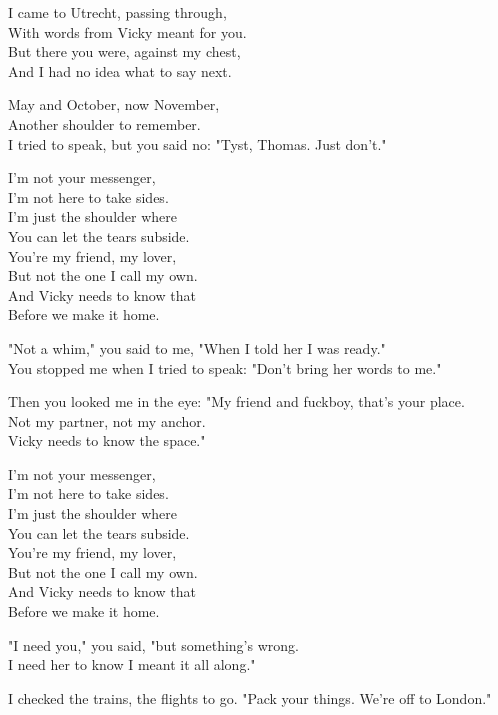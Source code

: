\begin{lyrics}
I came to Utrecht, passing through,\\
With words from Vicky meant for you.\\
But there you were, against my chest,\\
And I had no idea what to say next.

May and October, now November,\\
Another shoulder to remember.\\
I tried to speak, but you said no:
"Tyst, Thomas. Just don't."

I'm not your messenger,\\
I'm not here to take sides.\\
I'm just the shoulder where\\
You can let the tears subside.\\
You're my friend, my lover,\\
But not the one I call my own.\\
And Vicky needs to know that\\
Before we make it home.

"Not a whim," you said to me,
"When I told her I was ready."\\
You stopped me when I tried to speak:
"Don't bring her words to me."

Then you looked me in the eye:
"My friend and fuckboy, that's your place.\\
Not my partner, not my anchor.\\
Vicky needs to know the space."

I'm not your messenger,\\
I'm not here to take sides.\\
I'm just the shoulder where\\
You can let the tears subside.\\
You're my friend, my lover,\\
But not the one I call my own.\\
And Vicky needs to know that\\
Before we make it home.

"I need you," you said, "but something's wrong.\\
I need her to know I meant it all along."

I checked the trains, the flights to go.
"Pack your things. We're off to London."


\end{lyrics}
